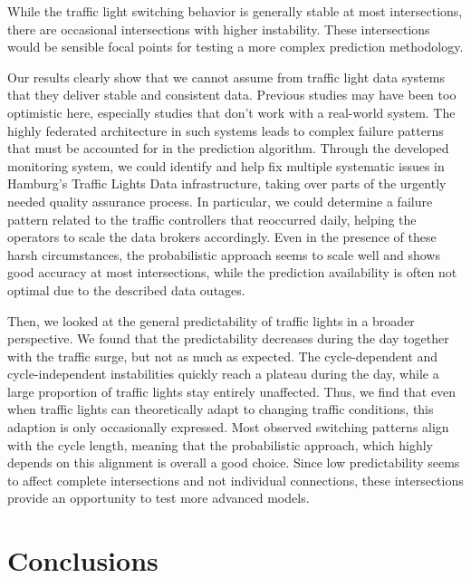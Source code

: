
While the traffic light switching behavior is generally stable at most intersections, there are occasional intersections with higher instability. These intersections would be sensible focal points for testing a more complex prediction methodology.

\begin{Summary}
Our results clearly show that we cannot assume from traffic light data systems that they deliver stable and consistent data. Previous studies may have been too optimistic here, especially studies that don’t work with a real-world system. The highly federated architecture in such systems leads to complex failure patterns that must be accounted for in the prediction algorithm. Through the developed monitoring system, we could identify and help fix multiple systematic issues in Hamburg’s Traffic Lights Data infrastructure, taking over parts of the urgently needed quality assurance process. In particular, we could determine a failure pattern related to the traffic controllers that reoccurred daily, helping the operators to scale the data brokers accordingly. Even in the presence of these harsh circumstances, the probabilistic approach seems to scale well and shows good accuracy at most intersections, while the prediction availability is often not optimal due to the described data outages.

Then, we looked at the general predictability of traffic lights in a broader perspective. We found that the predictability decreases during the day together with the traffic surge, but not as much as expected. The cycle-dependent and cycle-independent instabilities quickly reach a plateau during the day, while a large proportion of traffic lights stay entirely unaffected. Thus, we find that even when traffic lights can theoretically adapt to changing traffic conditions, this adaption is only occasionally expressed. Most observed switching patterns align with the cycle length, meaning that the probabilistic approach, which highly depends on this alignment is overall a good choice. Since low predictability seems to affect complete intersections and not individual connections, these intersections provide an opportunity to test more advanced models.
\end{Summary}

\section{Conclusions}

